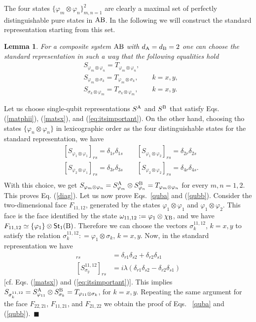 \documentclass[12pt,aps,pra,showpacs,groupedaddress]{revtex4-1}
\newtheorem{lemma}{Lemma} \newtheorem{proposition}{Proposition}
\def\Proof{\medskip\par\noindent{\bf Proof. }}
\def\qed{$\,\blacksquare$\par}
\def\rB{{\rm B}}
\def\Stset{{\mathsf{St}}}
\begin{document}
The four states $\{ \varphi_m \otimes \varphi_n\}_{m,n=1}^2$ are clearly a maximal set of perfectly distinguishable pure states in  $\rA\rB$.   In the following we will construct the standard representation starting from this set.  
\begin{lemma}
  For a composite system $\rA\rB$ with $d_\rA=d_\rB=2$ one can choose the standard
  representation in such a way that the following equalities hold 
    \begin{align}
   & S_{\varphi_m\otimes \varphi_n}=T_{\varphi_m\otimes \varphi_n},\label{diag}\\
    &S_{\varphi_m\otimes \sigma_k}=T_{\varphi_m\otimes \sigma_k}, \qquad k = x,y\label{quba},\\
   & S_{\sigma_k\otimes \varphi_m}=T_{\sigma_k\otimes \varphi_m}, \qquad k=x,y\label{qubb}.
  \end{align}
  \label{lem:almost}
\end{lemma}

\Proof   Let us choose single-qubit representations $S^{\rm A}$ and $S^\rB$ that satisfy Eqs. (\ref{matphii}), (\ref{matsx}), and (\ref{eq:itsimportant}).   
On the other hand, choosing tho states $\{\varphi_n \otimes \varphi_n\}$ in lexicographic order as the four distinguishable states for the standard representation, we have  
\begin{align*}
&[S_{\varphi_1 \otimes \varphi_1}]_{rs} =  \delta_{1r} \delta_{1s} \qquad   [S_{\varphi_1 \otimes \varphi_2}]_{rs} =  \delta_{2r} \delta_{2s} \\
&[S_{\varphi_2 \otimes \varphi_1}]_{rs} =  \delta_{3r} \delta_{3s} \qquad   [S_{\varphi_2 \otimes \varphi_2}]_{rs} =  \delta_{4r} \delta_{4s} .\\
\end{align*}    
With this choice, we get $S_{\varphi_m \otimes \varphi_n} = S^\rA_{\varphi_m}  \otimes S^\rB_{\varphi_n}  =  T_{\varphi_m \otimes \varphi_n}$ for every $m,n=1,2$.  This  proves Eq. (\ref{diag}).    
Let us now prove Eqs.~\eqref{quba} and (\ref{qubb}).  Consider the two-dimensional face $F_{11,12}$, generated by the states $\varphi_1 \otimes \varphi_1$ and $\varphi_1\otimes \varphi_2$.  This face is the face identified by the state $\omega_{11,12}: = \varphi_1  \otimes \chi_\rB$, and we have $F_{11,12} \simeq \{\varphi_1\} \otimes  \Stset_1 (\rB)$.  Therefore we can choose the vectors  $\sigma_k^{11,12}$, $k=x,y$  to satisfy the relation  $\sigma_k^{11,12}: =  \varphi_1  \otimes \sigma_k$, $k =x,y$. 
Now, in the standard representation we have 
\begin{align*} 
[S_{\sigma_x}^{11,12}]_{rs}  &=  \delta_{r1}  \delta_{s2}  +  \delta_{r2}  \delta_{s1}\\
[S_{\sigma_y}^{11,12}]_{rs}  &= i \lambda  ( \delta_{r1}  \delta_{s2}  -  \delta_{r2}  \delta_{s1})
\end{align*} 
[cf. Eqs. (\ref{matsx}) and (\ref{eq:itsimportant})].    This implies $S_{\sigma^{11,12}_k}  =  S^\rA_{\varphi_{11}}  \otimes S^\rB_{\sigma_k} = T_{\varphi_{11}\otimes \sigma_k}$, for $k=x,y$.  Repeating the same argument for the face $F_{22,21}$, $F_{11,21}$, and $F_{21,22}$ we obtain the proof of Eqs.   ~\eqref{quba} and (\ref{qubb}).  \qed
\end{document}
